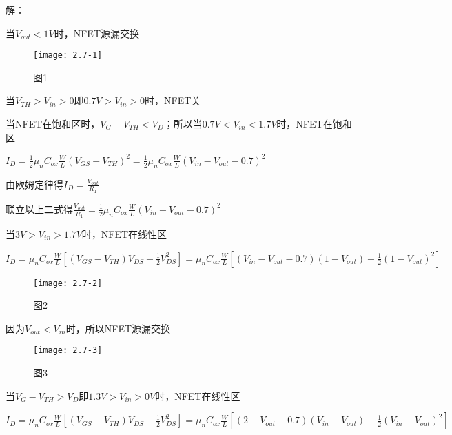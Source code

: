 

解：

\scalebox{3}{（a）}

当$V_{out}<1V$时，NFET源漏交换

		\begin{figure}[H] %
	\begin{minipage}{\linewidth}
		\texttt{[image: 2.7-1]}
	\end{minipage}
	\caption*{图1} %
\end{figure}

当$V_{TH}>V_{in}>0$即$0.7V>V_{in}>0$时，NFET关

当NFET在饱和区时，$V_{G}-V_{TH}<V_{D}$；所以当$0.7V<V_{in}<1.7V$时，NFET在饱和区

$I_D=\frac{1}{2}\mu_nC_{ox}\frac{W}{L}(V_{GS}-V_{TH})^2=\frac{1}{2}\mu_nC_{ox}\frac{W}{L}(V_{in}-V_{out}-0.7)^2$

由欧姆定律得$I_D=\frac{V_{out}}{R_1}$

联立以上二式得$\frac{V_{out}}{R_1}=\frac{1}{2}\mu_nC_{ox}\frac{W}{L}(V_{in}-V_{out}-0.7)^2$

当$3V>V_{in}>1.7V$时，NFET在线性区

$I_D=\mu_nC_{ox}\frac{W}{L}[(V_{GS}-V_{TH})V_{DS}-\frac{1}{2}V_{DS}^2]=\mu_nC_{ox}\frac{W}{L}[(V_{in}-V_{out}-0.7)(1-V_{out})-\frac{1}{2}(1-V_{out})^2]$

		\begin{figure}[H] %
	\begin{minipage}{\linewidth}
		\texttt{[image: 2.7-2]}
	\end{minipage}
	\caption*{图2} %
\end{figure}

\scalebox{3}{（b）}

因为$V_{out}<V_{in}$时，所以NFET源漏交换

		\begin{figure}[H] %
	\begin{minipage}{\linewidth}
		\texttt{[image: 2.7-3]}
	\end{minipage}
	\caption*{图3} %
\end{figure}

当$V_{G}-V_{TH}>V_{D}$即$1.3V>V_{in}>0V$时，NFET在线性区

$I_D=\mu_nC_{ox}\frac{W}{L}[(V_{GS}-V_{TH})V_{DS}-\frac{1}{2}V_{DS}^2]=\mu_nC_{ox}\frac{W}{L}[(2-V_{out}-0.7)(V_{in}-V_{out})-\frac{1}{2}(V_{in}-V_{out})^2]$

